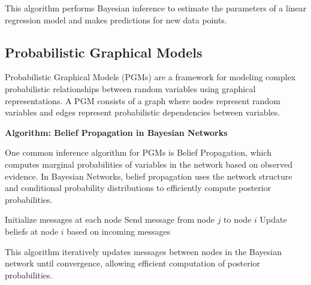 \documentclass[12pt]{book} %
\begin{document}
This algorithm performs Bayesian inference to estimate the parameters of a linear regression model and makes predictions for new data points.

\subsection{Probabilistic Graphical Models}
Probabilistic Graphical Models (PGMs) are a framework for modeling complex probabilistic relationships between random variables using graphical representations. A PGM consists of a graph where nodes represent random variables and edges represent probabilistic dependencies between variables.

\textbf{Algorithm: Belief Propagation in Bayesian Networks}

One common inference algorithm for PGMs is Belief Propagation, which computes marginal probabilities of variables in the network based on observed evidence. In Bayesian Networks, belief propagation uses the network structure and conditional probability distributions to efficiently compute posterior probabilities.
\FloatBarrier
\begin{algorithm}[H]
\caption{Belief Propagation in Bayesian Networks}
\begin{algorithmic}[1]
\State Initialize messages at each node
            \State Send message from node $j$ to node $i$
        \EndFor
        \State Update beliefs at node $i$ based on incoming messages
    \EndFor
\EndWhile
\end{algorithmic}
\end{algorithm}
\FloatBarrier

This algorithm iteratively updates messages between nodes in the Bayesian network until convergence, allowing efficient computation of posterior probabilities.
\end{document}
